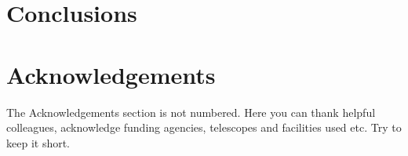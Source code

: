 \documentclass[a4paper,fleqn,usenatbib]{../mnras}
\begin{document}





\section{Conclusions}\label{sec:conclusions}
\section*{Acknowledgements}

The Acknowledgements section is not numbered. Here you can thank helpful
colleagues, acknowledge funding agencies, telescopes and facilities used etc.
Try to keep it short.
\end{document}
